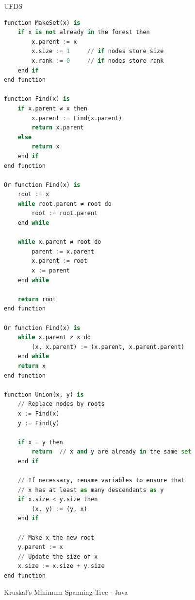 \documentclass[11pt]{scrartcl}
\begin{document}
\noindent UFDS
\begin{lstlisting}[language=Python]
function MakeSet(x) is
    if x is not already in the forest then
        x.parent := x
        x.size := 1     // if nodes store size
        x.rank := 0     // if nodes store rank
    end if
end function

function Find(x) is
    if x.parent ≠ x then
        x.parent := Find(x.parent)
        return x.parent
    else
        return x
    end if
end function

Or function Find(x) is
    root := x
    while root.parent ≠ root do
        root := root.parent
    end while

    while x.parent ≠ root do
        parent := x.parent
        x.parent := root
        x := parent
    end while

    return root
end function

Or function Find(x) is
    while x.parent ≠ x do
        (x, x.parent) := (x.parent, x.parent.parent)
    end while
    return x
end function

function Union(x, y) is
    // Replace nodes by roots
    x := Find(x)
    y := Find(y)

    if x = y then
        return  // x and y are already in the same set
    end if

    // If necessary, rename variables to ensure that
    // x has at least as many descendants as y
    if x.size < y.size then
        (x, y) := (y, x)
    end if

    // Make x the new root
    y.parent := x
    // Update the size of x
    x.size := x.size + y.size
end function

\end{lstlisting}
\vspace{5mm}
\noindent Kruskal's Minimum Spanning Tree - Java
\end{document}
